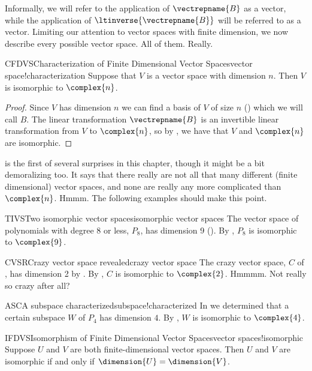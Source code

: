 %
Informally, we will refer to the application of $\vectrepname{B}$ as  a vector, while the application of $\ltinverse{\vectrepname{B}}$ will be referred to as  a vector.
%
%
Limiting our attention to vector spaces with finite dimension, we now describe every possible vector space.  All of them.  Really.  
%
\begin{theorem}{CFDVS}{Characterization of Finite Dimensional Vector Spaces}{vector space!characterization}
Suppose that $V$ is a vector space with dimension $n$.  Then $V$ is isomorphic to $\complex{n}$.
\end{theorem}
%
\begin{proof}
%
Since $V$ has dimension $n$ we can find a basis of $V$ of size $n$ () which we will call $B$.  The linear transformation $\vectrepname{B}$ is an invertible linear transformation from $V$ to $\complex{n}$, so by , we have that $V$ and $\complex{n}$ are isomorphic.
%
\end{proof}
%
 is the first of several surprises in this chapter, though it might be a bit demoralizing too.  It says that there really are not all that many different (finite dimensional) vector spaces, and none are really any more complicated than $\complex{n}$.  Hmmm.  The following examples should make this point.
%
\begin{example}{TIVS}{Two isomorphic vector spaces}{isomorphic vector spaces}
The vector space of polynomials with degree 8 or less, $P_8$, has dimension 9 ().  By , $P_8$ is isomorphic to $\complex{9}$.
%
\end{example}
%
\begin{example}{CVSR}{Crazy vector space revealed}{crazy vector space}
The crazy vector space, $C$ of , has dimension 2 by .  By , $C$ is isomorphic to $\complex{2}$.  Hmmmm.  Not really so crazy after all?
%
\end{example}
%
%
\begin{example}{ASC}{A subspace characterized}{subspace!characterized}
In  we determined that a certain subspace $W$ of $P_4$ has dimension $4$.  By , $W$ is isomorphic to $\complex{4}$.
%
\end{example}
%
\begin{theorem}{IFDVS}{Isomorphism of Finite Dimensional Vector Spaces}{vector spaces!isomorphic}
Suppose $U$ and $V$ are both finite-dimensional vector spaces.  Then $U$ and $V$ are isomorphic if and only if $\dimension{U}=\dimension{V}$.
\end{theorem}

